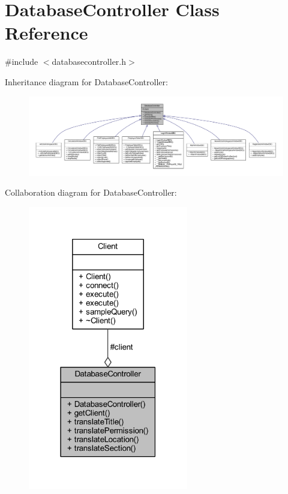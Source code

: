\hypertarget{class_database_controller}{}\section{Database\+Controller Class Reference}
\label{class_database_controller}


{\ttfamily \#include $<$databasecontroller.\+h$>$}



Inheritance diagram for Database\+Controller\+:
\nopagebreak
\begin{figure}[H]
\begin{center}
\leavevmode
\includegraphics[width=350pt]{class_database_controller__inherit__graph}
\end{center}
\end{figure}


Collaboration diagram for Database\+Controller\+:
\nopagebreak
\begin{figure}[H]
\begin{center}
\leavevmode
\includegraphics[width=198pt]{class_database_controller__coll__graph}
\end{center}
\end{figure}
